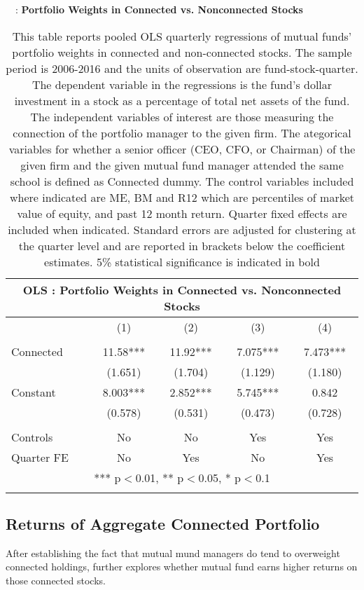 \documentclass[11pt]{article}
\begin{document}
\begin{doublespace}
\begin{table}
\centering
\caption{ \ \ : \large \bf Portfolio Weights in Connected vs. Nonconnected Stocks }
\begin{tabular}{lcccc}
\multicolumn{5}{c}{OLS : Portfolio Weights in Connected vs. Nonconnected Stocks} \\ \hline
 & (1) & (2) & (3) & (4) \\ \hline
 &  &  &  &  \\
Connected & 11.58*** & 11.92*** & 7.075*** & 7.473*** \\
 & (1.651) & (1.704) & (1.129) & (1.180) \\
Constant & 8.003*** & 2.852*** & 5.745*** & 0.842 \\
 & (0.578) & (0.531) & (0.473) & (0.728) \\
 &  &  &  &  \\
Controls & No & No & Yes & Yes \\
 Quarter FE & No & Yes & No & Yes \\ \hline
\multicolumn{5}{c}{ *** p$<$0.01, ** p$<$0.05, * p$<$0.1} \\
\label{table:3}
\end{tabular}
\caption*{This table reports pooled OLS quarterly regressions of mutual funds’ portfolio weights in connected and non-connected stocks. The sample
period is 2006-2016 and the units of observation are fund-stock-quarter. The dependent variable in the regressions is the fund’s dollar investment
in a stock as a percentage of total net assets of the fund. The independent variables of interest are those measuring the connection of the
portfolio manager to the given firm. The ategorical variables for whether a senior officer (CEO, CFO, or Chairman) of the
given firm and the given mutual fund manager attended the same school is defined as Connected dummy. The control variables included where indicated are ME, BM and R12 which are percentiles of market value of equity, and past 12 month return. Quarter fixed effects are included when indicated. Standard errors are adjusted for clustering at the quarter level and are reported in brackets below the coefficient estimates. 5\% statistical significance is indicated in bold}
\end{table}





\subsection{Returns of Aggregate Connected Portfolio}
After establishing the fact that mutual mund managers do tend to overweight connected holdings, \cite{cohen2008small} further explores whether mutual fund earns higher returns on those connected stocks. 


\end{doublespace}
\end{document}
